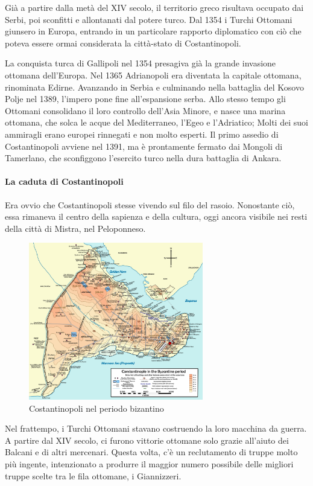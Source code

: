 \documentclass[11pt]{report}
\begin{document}
	Già a partire dalla metà del XIV secolo, il territorio greco risultava occupato dai Serbi, poi sconfitti e allontanati dal potere turco. Dal 1354 i Turchi Ottomani giunsero in Europa, entrando in un particolare rapporto diplomatico con ciò che poteva essere ormai considerata la città-stato di Costantinopoli.\cite{o2005philip}
	
	La conquista turca di Gallipoli nel 1354 presagiva già la
	grande invasione ottomana dell'Europa. Nel 1365
	Adrianopoli era diventata la capitale ottomana, rinominata Edirne.
	Avanzando in Serbia e culminando nella battaglia del Kosovo
	Polje nel 1389, l'impero pone fine all'espansione serba. Allo stesso
	tempo gli Ottomani consolidano il loro controllo dell'Asia Minore,
	e nasce una marina ottomana, che solca le acque del Mediterraneo, l'Egeo e l'Adriatico; Molti dei suoi ammiragli erano europei rinnegati e non molto esperti. Il primo assedio di Costantinopoli avviene nel 1391, ma è prontamente fermato dai Mongoli di Tamerlano, che sconfiggono l'esercito turco nella dura battaglia di Ankara.
	
	\paragraph*{La caduta di Costantinopoli}
	
	Era ovvio che Costantinopoli stesse vivendo sul filo del rasoio. Nonostante ciò, essa rimaneva il centro della sapienza e della cultura, oggi ancora visibile nei resti della città di Mistra, nel Peloponneso.
	
	\begin{figure}
		\includegraphics[width=3in]{"costantinopoli"}
		\caption{{\small Costantinopoli nel periodo bizantino}}
	\end{figure} 
	
	Nel frattempo, i Turchi Ottomani stavano costruendo la loro macchina da guerra. A partire dal XIV secolo, ci furono vittorie ottomane solo grazie all'aiuto dei Balcani e di altri mercenari. Questa volta, c'è un reclutamento di truppe molto più ingente, intenzionato a produrre il maggior numero possibile delle migliori truppe scelte tra le fila ottomane, i Giannizzeri.\\
	
\end{document}
